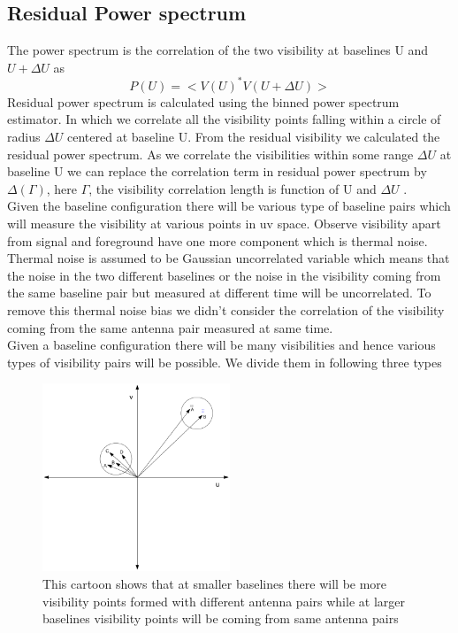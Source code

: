 \documentclass[fleqn,usenatbib]{mnras}
\begin{document}
\subsection{Residual Power spectrum}
The power spectrum is the correlation of the two visibility at baselines U and $U+\Delta U$ as
\begin{equation}
    P(U) = <V(U)^* V(U+\Delta U)>
\end{equation}
Residual power spectrum is calculated using the binned power spectrum estimator. In which we correlate all the visibility points falling within a circle of radius $\Delta U$  centered at baseline U. From the residual visibility we calculated the residual power spectrum.  As we correlate the visibilities within some range $\Delta U$ at baseline U we can replace the correlation term in residual power spectrum by $\Delta(\Gamma)$, here $\Gamma$, the visibility correlation length is function of U and $\Delta U$ .\\
Given the baseline configuration there will be various type of baseline pairs which will measure the visibility at various points in uv space. Observe visibility apart from signal and foreground have one more component which is thermal noise. Thermal noise is assumed to be Gaussian uncorrelated variable which means that the noise in the two different baselines or the noise in the visibility coming from the same baseline pair but measured at different time will be uncorrelated. To remove this thermal noise bias we didn't consider the correlation of the visibility coming from the same antenna pair measured at same time.\\
Given a baseline configuration there will be many visibilities and hence various types of visibility pairs will be possible. We divide them in following three types\\
\begin{figure}
    \centering
    \includegraphics[width=0.5\textwidth]{Baseline_ABCD.png}
    \caption{This cartoon shows that at smaller baselines there will be more visibility points formed with different  antenna pairs while at larger baselines visibility points will be coming from same antenna pairs  }
    \label{fig:my_label}
\end{figure}
\end{document}
